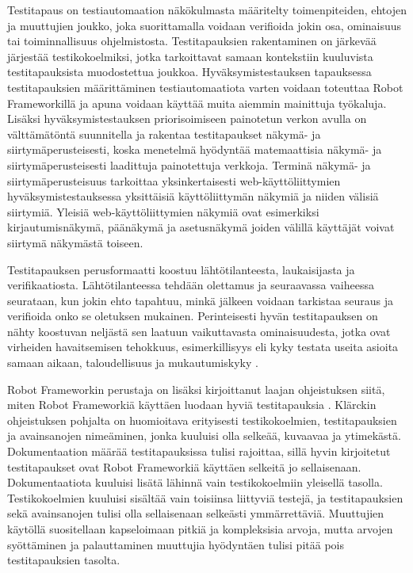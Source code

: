   Testitapaus on testiautomaation näkökulmasta määritelty toimenpiteiden, ehtojen ja muuttujien joukko, joka suorittamalla voidaan verifioida jokin osa, ominaisuus tai toiminnallisuus ohjelmistosta.
  Testitapauksien rakentaminen on järkevää järjestää testikokoelmiksi, jotka tarkoittavat samaan kontekstiin kuuluvista testitapauksista muodostettua joukkoa.
  Hyväksymistestauksen tapauksessa testitapauksien määrittäminen testiautomaatiota varten voidaan toteuttaa Robot Frameworkillä \cite{robot_framework_book} ja apuna voidaan käyttää muita aiemmin mainittuja työkaluja.
  Lisäksi hyväksymistestauksen priorisoimiseen painotetun verkon avulla on välttämätöntä suunnitella ja rakentaa testitapaukset näkymä- ja siirtymäperusteisesti, koska menetelmä hyödyntää matemaattisia näkymä- ja siirtymäperusteisesti laadittuja painotettuja verkkoja.
  Terminä näkymä- ja siirtymäperusteisuus tarkoittaa yksinkertaisesti web-käyttöliittymien hyväksymistestauksessa yksittäisiä käyttöliittymän näkymiä ja niiden välisiä siirtymiä.
  Yleisiä web-käyttöliittymien näkymiä ovat esimerkiksi kirjautumisnäkymä, päänäkymä ja asetusnäkymä joiden välillä käyttäjät voivat siirtymä näkymästä toiseen.

  Testitapauksen perusformaatti koostuu lähtötilanteesta, laukaisijasta ja verifikaatiosta.
  Lähtötilanteessa tehdään olettamus ja seuraavassa vaiheessa seurataan, kun jokin ehto tapahtuu, minkä jälkeen voidaan tarkistaa seuraus ja verifioida onko se oletuksen mukainen.
  Perinteisesti hyvän testitapauksen on nähty koostuvan neljästä sen laatuun vaikuttavasta ominaisuudesta, jotka ovat virheiden havaitsemisen tehokkuus, esimerkillisyys eli kyky testata useita asioita samaan aikaan, taloudellisuus ja mukautumiskyky \cite[s.~4]{software_test_automation_book}.

  Robot Frameworkin perustaja on lisäksi kirjoittanut laajan ohjeistuksen siitä, miten Robot Frameworkiä käyttäen luodaan hyviä testitapauksia \cite{robot_framework_good_test_cases}.
  Klärckin ohjeistuksen pohjalta on huomioitava erityisesti testikokoelmien, testitapauksien ja avainsanojen nimeäminen, jonka kuuluisi olla selkeää, kuvaavaa ja ytimekästä.
  Dokumentaation määrää testitapauksissa tulisi rajoittaa, sillä hyvin kirjoitetut testitapaukset ovat Robot Frameworkiä käyttäen selkeitä jo sellaisenaan.
  Dokumentaatiota kuuluisi lisätä lähinnä vain testikokoelmiin yleisellä tasolla.
  Testikokoelmien kuuluisi sisältää vain toisiinsa liittyviä testejä, ja testitapauksien sekä avainsanojen tulisi olla sellaisenaan selkeästi ymmärrettäviä.
  Muuttujien käytöllä suositellaan kapseloimaan pitkiä ja kompleksisia arvoja, mutta arvojen syöttäminen ja palauttaminen muuttujia hyödyntäen tulisi pitää pois testitapauksien tasolta.

